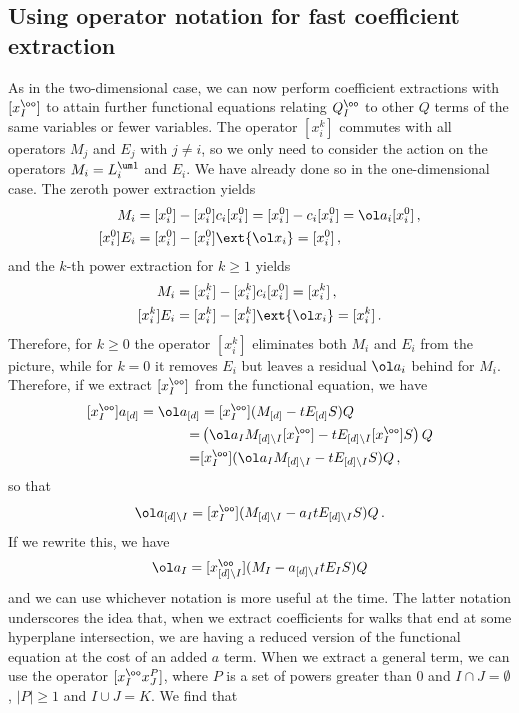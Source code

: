 \subsection{Using operator notation for fast coefficient extraction}
As in the two-dimensional case, we can now perform coefficient extractions with $[x_I^\oo]$ to attain further functional equations relating $Q_I^\oo$ to other $Q$ terms of the same variables or fewer variables. The operator $[x_i^k]$ commutes with all operators $M_j$ and $E_j$ with $j\neq i$, so we only need to consider the action on the operators $M_i = L_i^{\um 1}$ and $E_i$. We have already done so in the one-dimensional case. The zeroth power extraction yields
\begin{align}
	[x_i^0]M_i &= [x_i^0]-[x_i^0]c_i[x_i^0] = [x_i^0]-c_i[x_i^0] = \ol a_i[x_i^0]\,,\\
	[x_i^0]E_i &= [x_i^0] - [x_i^0]\ext{\ol x_i} = [x_i^0]\,,
\end{align}
and the $k$-th power extraction for $k\ge 1$ yields
\begin{align}
	[x_i^k]M_i &= [x_i^k]-[x_i^k]c_i[x_i^0] = [x_i^k]\,,\\
	[x_i^k]E_i &= [x_i^k] - [x_i^k]\ext{\ol x_i} = [x_i^k]\,.
\end{align}
Therefore, for $k\ge 0$ the operator $[x_i^k]$ eliminates both $M_i$ and $E_i$ from the picture, while for $k = 0$ it removes $E_i$ but leaves a residual $\ol a_i$ behind for $M_i$. Therefore, if we extract $[x_I^\oo]$ from the functional equation, we have
\begin{align}\begin{split}
	[x_I^\oo]a_{[d]} =\ol a_{[d]} &= [x_I^\oo](M_{[d]} - tE_{[d]}S)Q \\
	= &\left(\ol a_{I}M_{[d]\backslash I}[x_I^\oo] - tE_{[d]\backslash I}[x_I^\oo]S\right)Q\\
	= &[x_I^\oo](\ol a_{I}M_{[d]\backslash I}- tE_{[d]\backslash I}S)Q\,,
\end{split}\end{align}
so that
\begin{align}
	\ol a_{[d]\backslash I} = [x_I^\oo](M_{[d]\backslash I}- a_{I}tE_{[d]\backslash I}S)Q\,.
\end{align}
If we rewrite this, we have
\begin{align}
	\ol a_I = [x_{[d]\backslash I}^\oo](M_I - a_{[d]\backslash I} tE_I S)Q
\end{align}
and we can use whichever notation is more useful at the time. The latter notation underscores the idea that, when we extract coefficients for walks that end at some hyperplane intersection, we are having a reduced version of the functional equation at the cost of an added $a$ term. When we extract a general term, we can use the operator $[x_I^\oo x_J^P]$, where $P$ is a set of powers greater than 0 and $I\cap J = \emptyset$, $|P| \ge 1$ and $I\cup J = K$. We find that
